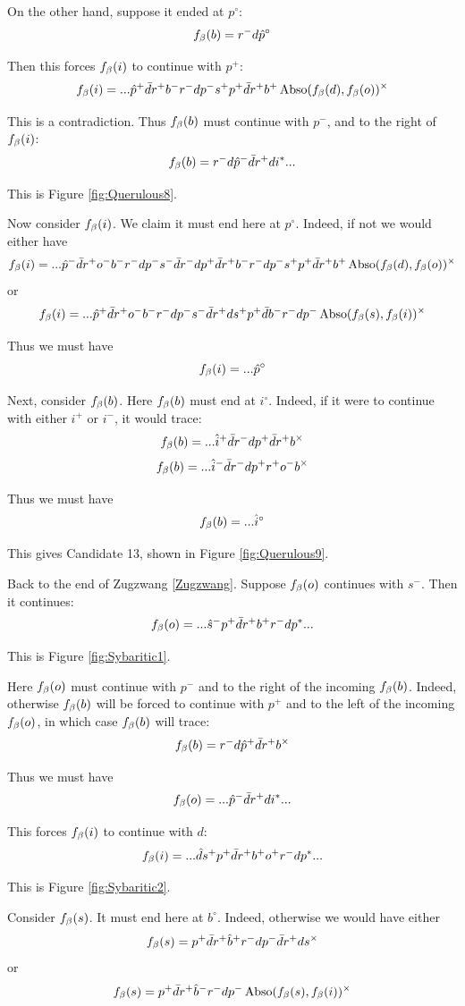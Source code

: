 On the other hand, suppose it ended at $p^\circ$:
\[
f_\beta(b) = r^- d \hat{p}^\circ
\]

Then this forces $f_\beta(i)$ to continue with $p^+$:
\[
f_\beta(i) = ... \hat{p}^+ \bar{d} r^+ b^-r^- d p^- s^+ p^+ \bar{d} r^+ b^+ \operatorname{Abso}(f_\beta(d), f_\beta(o))^\times
\]

This is a contradiction. Thus $f_\beta(b)$ must continue with $p^-$, and to the right of $f_\beta(i)$:
\[
f_\beta(b) = r^- d \hat{p}^- \bar{d} r^+ d i^*...
\]

This is Figure \ref{fig:Querulous8}.


Now consider $f_\beta(i)$. We claim it must end here at $p^\circ$. Indeed, if not we would either have
\[
f_\beta(i) =...\hat{p}^- \bar{d} r^+ o^- b^- r^- d p^- s^- \bar{d} r^- d p^+ \bar{d} r^+ b^- r^- d p^- s^+ p^+ \bar{d} r^+ b^+ \operatorname{Abso}(f_\beta(d), f_\beta(o))^\times
\]
or
\[
f_\beta(i) =...\hat{p}^+ \bar{d} r^+ o^- b^- r^- d p^- s^- \bar{d} r^+ d s^+ p^+ \bar{d} b^- r^- d p^- \operatorname{Abso}(f_\beta(s), f_\beta(i))^\times
\]

Thus we must have
\[
f_\beta(i) =...\hat{p}^\circ
\]

Next, consider $f_\beta(b)$. Here $f_\beta(b)$ must end at $i^\circ$. Indeed, if it were to continue with either $i^+$ or $i^-$, it would trace:
\[
f_\beta(b) =...\hat{i}^+ \bar{d} r^- d p^+ \bar{d} r^+ b^\times
\]
\[
f_\beta(b) =...\hat{i}^- \bar{d} r^- d p^+ r^+ o^- b^\times
\]

Thus we must have
\[
f_\beta(b) =...\hat{i}^\circ
\]

This gives Candidate 13, shown in Figure \ref{fig:Querulous9}.

\label{Sybaritic}
Back to the end of Zugzwang \ref{Zugzwang}. Suppose $f_\beta(o)$ continues with $s^-$. Then it continues:
\[
f_\beta(o) = ...\hat{s}^- p^+ \bar{d} r^+ b^+ r^- d p^*...
\]

This is Figure \ref{fig:Sybaritic1}.

Here $f_\beta(o)$ must continue with $p^-$ and to the right of the incoming $f_\beta(b)$. Indeed, otherwise $f_\beta(b)$ will be forced to continue with $p^+$ and to the left of the incoming $f_\beta(o)$, in which case $f_\beta(b)$ will trace:
\[
f_\beta(b) = r^- d \hat{p}^+ \bar{d} r^+ b^\times
\]

Thus we must have
\[
f_\beta(o) =...\hat{p}^- \bar{d} r^+ d i^*...
\]

This forces $f_\beta(i)$ to continue with $d$:
\[
f_\beta(i) =...\hat{d} s^+ p^+ \bar{d} r^+ b^+ o^+ r^- d p^*... 
\]

This is Figure \ref{fig:Sybaritic2}.

Consider $f_\beta(s)$. It must end here at $b^\circ$. Indeed, otherwise we would have either
\[
f_\beta(s) = p^+ \bar{d} r^+ \hat{b}^+ r^- d p^- \bar{d} r^+ d s^\times
\]
or
\[
f_\beta(s) = p^+ \bar{d} r^+ \hat{b}^- r^- d p^- \operatorname{Abso}(f_\beta(s), f_\beta(i))^\times
\]

